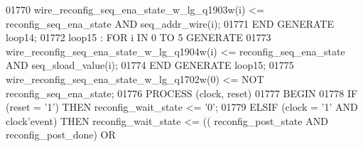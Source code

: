 \begin{DoxyCode}
{01770         \textcolor{vhdlchar}{wire_reconfig_seq_ena_state_w_lg_q1903w}\textcolor{vhdlchar}{(}\textcolor{vhdlchar}{i}\textcolor{vhdlchar}{)} \textcolor{vhdlchar}{<=} \textcolor{vhdlchar}{reconfig_seq_ena_state} \textcolor{keywordflow}{AND} \textcolor{vhdlchar}{
      seq_addr_wire}\textcolor{vhdlchar}{(}\textcolor{vhdlchar}{i}\textcolor{vhdlchar}{)};
01771     \textcolor{keywordflow}{END} \textcolor{keywordflow}{GENERATE} \textcolor{vhdlchar}{loop14};
01772     \textcolor{vhdlchar}{loop15} \textcolor{vhdlchar}{:} \textcolor{keywordflow}{FOR} \textcolor{vhdlchar}{i} \textcolor{keywordflow}{IN} \textcolor{vhdllogic}{}\textcolor{vhdllogic}{0} \textcolor{keywordflow}{TO} \textcolor{vhdllogic}{}\textcolor{vhdllogic}{5} \textcolor{keywordflow}{GENERATE} 
01773         \textcolor{vhdlchar}{wire_reconfig_seq_ena_state_w_lg_q1904w}\textcolor{vhdlchar}{(}\textcolor{vhdlchar}{i}\textcolor{vhdlchar}{)} \textcolor{vhdlchar}{<=} \textcolor{vhdlchar}{reconfig_seq_ena_state} \textcolor{keywordflow}{AND} \textcolor{vhdlchar}{
      seq_sload_value}\textcolor{vhdlchar}{(}\textcolor{vhdlchar}{i}\textcolor{vhdlchar}{)};
01774     \textcolor{keywordflow}{END} \textcolor{keywordflow}{GENERATE} \textcolor{vhdlchar}{loop15};
01775     \textcolor{vhdlchar}{wire_reconfig_seq_ena_state_w_lg_q1702w}\textcolor{vhdlchar}{(}\textcolor{vhdllogic}{}\textcolor{vhdllogic}{0}\textcolor{vhdlchar}{)} \textcolor{vhdlchar}{<=} \textcolor{keywordflow}{NOT} \textcolor{vhdlchar}{reconfig_seq_ena_state};
01776     \textcolor{keywordflow}{PROCESS} (clock, reset)
01777 \textcolor{vhdlkeyword}{    BEGIN}
01778         \textcolor{keywordflow}{IF} \textcolor{vhdlchar}{(}\textcolor{vhdlchar}{reset} \textcolor{vhdlchar}{=} \textcolor{vhdlchar}{'}\textcolor{vhdllogic}{}\textcolor{vhdllogic}{1}\textcolor{vhdlchar}{'}\textcolor{vhdlchar}{)} \textcolor{keywordflow}{THEN} \textcolor{vhdlchar}{reconfig_wait_state} \textcolor{vhdlchar}{<=} \textcolor{vhdlchar}{'}\textcolor{vhdllogic}{}\textcolor{vhdllogic}{0}\textcolor{vhdlchar}{'};
01779         \textcolor{keywordflow}{ELSIF} \textcolor{vhdlchar}{(}\textcolor{vhdlchar}{clock} \textcolor{vhdlchar}{=} \textcolor{vhdlchar}{'}\textcolor{vhdllogic}{}\textcolor{vhdllogic}{1}\textcolor{vhdlchar}{'} \textcolor{keywordflow}{AND} \textcolor{vhdlchar}{clock}\textcolor{vhdlchar}{'}\textcolor{vhdlkeyword}{event}\textcolor{vhdlchar}{)} \textcolor{keywordflow}{THEN} \textcolor{vhdlchar}{reconfig_wait_state} \textcolor{vhdlchar}{<=} \textcolor{vhdlchar}{(}\textcolor{vhdlchar}{(}\textcolor{vhdlchar}{
      reconfig_post_state} \textcolor{keywordflow}{AND} \textcolor{vhdlchar}{reconfig_post_done}\textcolor{vhdlchar}{)} \textcolor{keywordflow}{OR} \textcolor{vhdlchar}{
}}
\end{DoxyCode}
